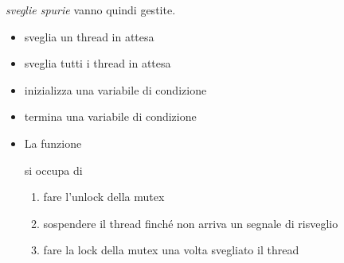 \documentclass[10pt, letterpaper]{report}
\begin{document}
\textit{sveglie spurie} vanno quindi gestite.\begin{itemize}
    \item {} sveglia un thread in attesa
    \item {} sveglia tutti i thread in attesa
    \item {} inizializza una variabile di condizione
    \item {} termina una variabile di condizione
    \item La funzione\begin{quote}
    \end{quote} si occupa di \begin{enumerate}
        \item   fare l'unlock della mutex 
        \item   sospendere il thread finché non arriva un segnale di risveglio  
        \item fare la lock della mutex una volta svegliato il thread
    \end{enumerate}
\end{itemize}
\end{document}
